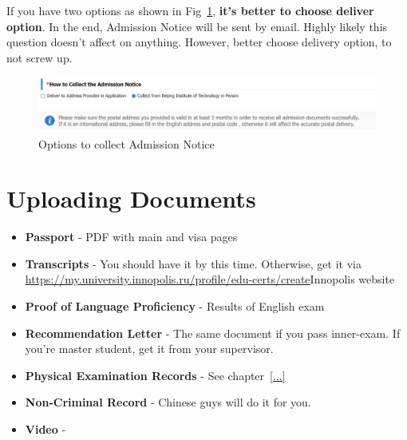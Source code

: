 If you have two options as shown in Fig~\ref{fig:ru_collect_adm_not},
\textbf{it's better to choose deliver option}.
In the end, Admission Notice will be sent by email.
Highly likely this question doesn't affect on anything.
However, better choose delivery option, to not screw up.


\begin{figure}[H]
    \centering
    \includegraphics[width=\textwidth]{russia/imgs/app_adm_notice}
    \caption{\centering Options to collect Admission Notice}
    \label{fig:ru_collect_adm_not}
\end{figure}






\section{Uploading Documents}\label{sec:ru_upload_docs}

\begin{itemize}
    \item \textbf{Passport} - PDF with main and visa pages

    \item \textbf{Transcripts} - You should have it by this time.
        Otherwise, get it via
    \url{https://my.university.innopolis.ru/profile/edu-certs/create}{Innopolis website}

    \item \textbf{Proof of Language Proficiency} - Results of English exam

    \item \textbf{Recommendation Letter} - The same document if you pass inner-exam.
    If you're master student, get it from your supervisor.

    \item \textbf{Physical Examination Records} - See chapter~\ref{...}

    \item \textbf{Non-Criminal Record} - Chinese guys will do it for you.

    \item \textbf{Video} -

\end{itemize}